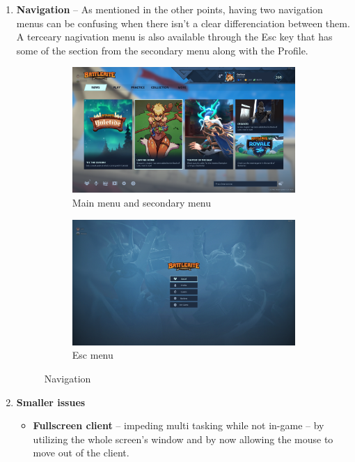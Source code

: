 \documentclass[a4paper,12pt]{article}
\begin{document}
\begin{enumerate}[label=\textbf{\arabic*})]
    \item \textbf{Navigation} -- As mentioned in the other points, having two navigation menus can be confusing when there isn't a clear differenciation between them. A terceary nagivation menu is also available through the Esc key that has some of the section from the secondary menu along with the Profile.
    \begin{figure}[h!]
        \centering
        \begin{subfigure}[b]{0.45\linewidth}
            \includegraphics[width=\linewidth]{res/current/news.png}
            \caption{Main menu and secondary menu}
        \end{subfigure}
        \begin{subfigure}[b]{0.45\linewidth}
            \includegraphics[width=\linewidth]{res/current/escape.png}
            \caption{Esc menu}
        \end{subfigure}
        \caption{Navigation}
        \label{fig:play_vs_practice}
    \end{figure}
    
    \item \textbf{Smaller issues} \begin{itemize}
        \item \textbf{Fullscreen client} -- impeding multi tasking while not in-game -- by utilizing the whole screen's window and by now allowing the mouse to move out of the client.
    \end{itemize}
\end{enumerate}
\end{document}
